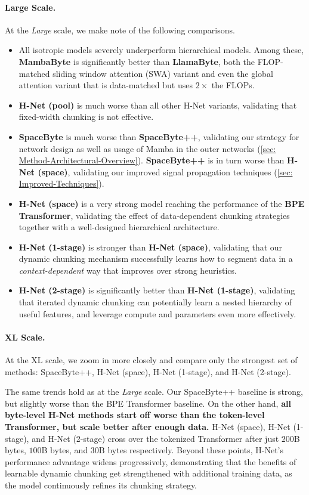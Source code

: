 \documentclass{article}
\newcommand{\model}{H-Net}
\theoremstyle{plain}
\theoremstyle{remark}
\begin{document}
\paragraph{Large Scale.}
At the \emph{Large} scale, we make note of the following comparisons.
\begin{itemize}
    \item All isotropic models severely underperform hierarchical models. Among these, \textbf{MambaByte} is significantly better than \textbf{LlamaByte}, both the FLOP-matched sliding window attention (SWA) variant  and even the global attention variant that is data-matched but uses $2\times$ the FLOPs.
    \item \textbf{H-Net (pool)} is much worse than all other H-Net variants, validating that fixed-width chunking is not effective.
    \item \textbf{SpaceByte} is much worse than \textbf{SpaceByte++}, validating our strategy for network design as well as usage of Mamba in the outer networks (\cref{sec: Method-Architectural-Overview}).
    \textbf{SpaceByte++} is in turn worse than \textbf{H-Net (space)}, validating our improved signal propagation techniques (\cref{sec: Improved-Techniques}).
    \item \textbf{H-Net (space)} is a very strong model reaching the performance of the \textbf{BPE Transformer}, validating the effect of data-dependent chunking strategies together with a well-designed hierarchical architecture.
    \item \textbf{H-Net (1-stage)} is stronger than \textbf{H-Net (space)}, validating that our dynamic chunking mechanism successfully learns how to segment data in a \emph{context-dependent} way that improves over strong heuristics.
    \item \textbf{H-Net (2-stage)} is significantly better than \textbf{H-Net (1-stage)}, validating  that iterated dynamic chunking can potentially learn a nested hierarchy of useful features, and leverage compute and parameters even more effectively.
\end{itemize}

\paragraph{XL Scale.}
At the XL scale, we zoom in more closely and compare only the strongest set of methods: SpaceByte++, H-Net (space), H-Net (1-stage), and H-Net (2-stage).

The same trends hold as at the \emph{Large} scale.
Our SpaceByte++ baseline is strong, but slightly worse than the BPE Transformer baseline.
On the other hand, \textbf{all byte-level H-Net methods start off worse than the token-level Transformer, but scale better after enough data.}
H-Net (space), H-Net (1-stage), and H-Net (2-stage)
cross over the tokenized Transformer after just
$200$B bytes, $100$B bytes, and $30$B bytes respectively.
Beyond these points, \model{}'s performance advantage widens progressively, demonstrating that the benefits of learnable dynamic chunking get strengthened with additional training data,
as the model continuously refines its chunking strategy.
\end{document}
